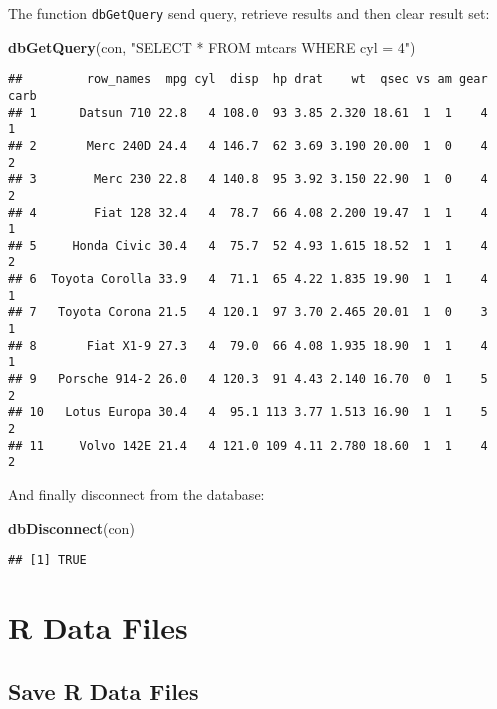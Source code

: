 \documentclass[]{book}
\newenvironment{Shaded}{\begin{snugshade}}{\end{snugshade}}
\newcommand{\KeywordTok}[1]{\textcolor[rgb]{0.13,0.29,0.53}{\textbf{{#1}}}}
\newcommand{\StringTok}[1]{\textcolor[rgb]{0.31,0.60,0.02}{{#1}}}
\newcommand{\NormalTok}[1]{{#1}}
\begin{document}
The function \texttt{dbGetQuery} send query, retrieve results and then
clear result set:

\begin{Shaded}
\begin{Highlighting}[]
\KeywordTok{dbGetQuery}\NormalTok{(con, }\StringTok{"SELECT * FROM mtcars WHERE cyl = 4"}\NormalTok{)}
\end{Highlighting}
\end{Shaded}

\begin{verbatim}
##         row_names  mpg cyl  disp  hp drat    wt  qsec vs am gear carb
## 1      Datsun 710 22.8   4 108.0  93 3.85 2.320 18.61  1  1    4    1
## 2       Merc 240D 24.4   4 146.7  62 3.69 3.190 20.00  1  0    4    2
## 3        Merc 230 22.8   4 140.8  95 3.92 3.150 22.90  1  0    4    2
## 4        Fiat 128 32.4   4  78.7  66 4.08 2.200 19.47  1  1    4    1
## 5     Honda Civic 30.4   4  75.7  52 4.93 1.615 18.52  1  1    4    2
## 6  Toyota Corolla 33.9   4  71.1  65 4.22 1.835 19.90  1  1    4    1
## 7   Toyota Corona 21.5   4 120.1  97 3.70 2.465 20.01  1  0    3    1
## 8       Fiat X1-9 27.3   4  79.0  66 4.08 1.935 18.90  1  1    4    1
## 9   Porsche 914-2 26.0   4 120.3  91 4.43 2.140 16.70  0  1    5    2
## 10   Lotus Europa 30.4   4  95.1 113 3.77 1.513 16.90  1  1    5    2
## 11     Volvo 142E 21.4   4 121.0 109 4.11 2.780 18.60  1  1    4    2
\end{verbatim}

And finally disconnect from the database:

\begin{Shaded}
\begin{Highlighting}[]
\KeywordTok{dbDisconnect}\NormalTok{(con)}
\end{Highlighting}
\end{Shaded}

\begin{verbatim}
## [1] TRUE
\end{verbatim}

\clearpage

\section{R Data Files}\label{r-data-files}

\subsection{Save R Data Files}\label{save-r-data-files}
\end{document}
